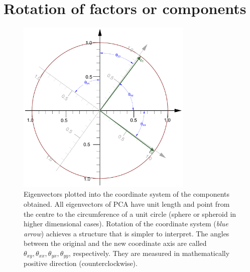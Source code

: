 \section{Rotation of factors or components}

\begin{figure}
   \caption{Eigenvectors plotted into the coordinate system of the components obtained. All eigenvectors of \acs{PCA} have unit length and point from the centre to the circumference of a unit circle (sphere or spheroid in higher dimensional cases). Rotation of the coordinate system (\emph{blue arrow}) achieves a structure that is simpler to interpret. The angles between the original and the new coordinate axis are called \(\theta_{xy}, \theta_{xx}, \theta_{yx}, \theta_{yy} \), respectively. They are measured in mathematically positive direction (counterclockwise).}
   \label{fig:RotGeo}
   \centering
      \includegraphics[width=0.75\textwidth]{Graphics/Rotation}
\end{figure}

